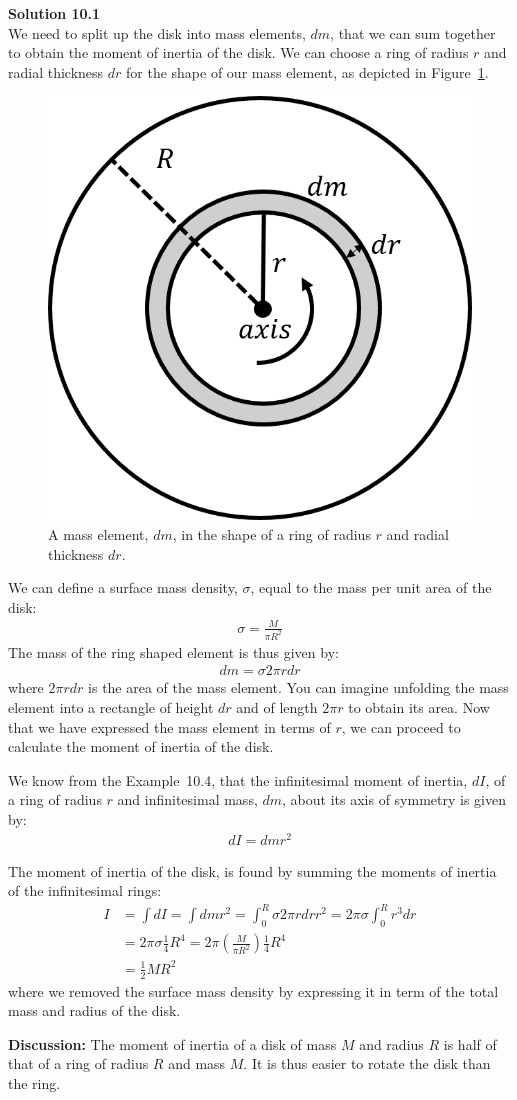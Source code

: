 \begin{framed}
\textbf{Solution 10.1}\\
We need to split up the disk into mass elements, $dm$, that we can sum together to obtain the moment of inertia of the disk. We can choose a ring of radius $r$ and radial thickness $dr$ for the shape of our mass element, as depicted in Figure~\ref{fig:rotationaldynamics:diskI}.

\begin{figure}[!htbp]
\centering
\includegraphics[width=0.375\linewidth]{files/diskI-cde410e1a6a2ec40a14e7e5e216d4893.png}
\caption[]{A mass element, $dm$, in the shape of a ring of radius $r$ and radial thickness $dr$.}
\label{fig:rotationaldynamics:diskI}
\end{figure}

We can define a surface mass density, $\sigma$, equal to the mass per unit area of the disk:
\begin{align*}
\sigma = \frac{M}{\pi R^2}
\end{align*}
The mass of the ring shaped element is thus given by:
\begin{align*}
dm = \sigma 2\pi r dr
\end{align*}
where $2\pi r dr$ is the area of the mass element. You can imagine unfolding the mass element into a rectangle of height $dr$ and of length $2\pi r$ to obtain its area. Now that we have expressed the mass element in terms of $r$, we can proceed to calculate the moment of inertia of the disk.

We know from the Example~10.4, that the infinitesimal moment of inertia, $dI$, of a ring of radius $r$ and infinitesimal mass, $dm$, about its axis of symmetry is given by:
\begin{align*}
dI = dm r^2
\end{align*}

The moment of inertia of the disk, is found by summing the moments of inertia of the infinitesimal rings:
\begin{align*}
I &=\int dI = \int dm r^2 = \int_0^R \sigma 2\pi r dr r^2 =2\pi \sigma \int_0^R  r^3 dr \\
&=2 \pi \sigma \frac{1}{4}R^4 = 2\pi \left( \frac{M}{\pi R^2} \right) \frac{1}{4}R^4\\
&=\frac{1}{2}MR^2
\end{align*}
where we removed the surface mass density by expressing it in term of the total mass and radius of the disk.

\textbf{Discussion:} The moment of inertia of a disk of mass $M$ and radius $R$ is half of that of a ring of radius $R$ and mass $M$. It is thus easier to rotate the disk than the ring.
\end{framed}

